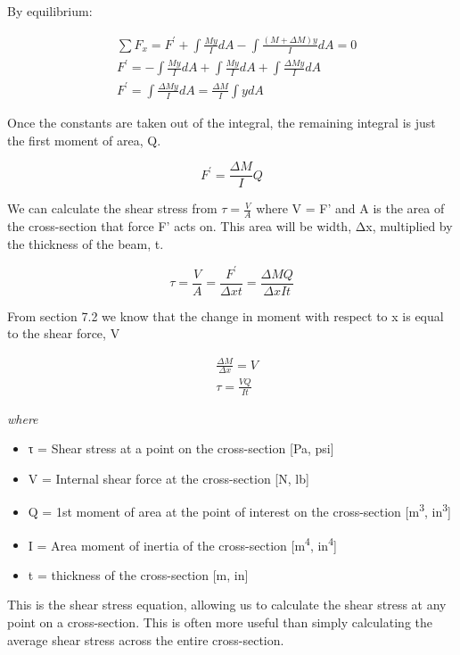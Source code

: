 \documentclass[
  letterpaper,
  DIV=11,
  numbers=noendperiod]{scrreprt}
\begin{document}
By equilibrium:

\[
\begin{aligned}
& \sum F_x=F^{\prime}+\int \frac{M y}{I} d A-\int \frac{(M+\Delta M) y}{I} d A=0 \\
& F^{\prime}=-\int \frac{M y}{I} d A+\int \frac{M y}{I} d A+\int \frac{\Delta M y}{I} d A \\
& F^{\prime}=\int \frac{\Delta M y}{I} d A=\frac{\Delta M}{I} \int y d A
\end{aligned}
\]

Once the constants are taken out of the integral, the remaining integral
is just the first moment of area, Q.

\[
F^{\prime}=\frac{\Delta M}{I} Q
\]

We can calculate the shear stress from \(\tau=\frac{V}{A}\) where V = F'
and A is the area of the cross-section that force F' acts on. This area
will be width, Δx, multiplied by the thickness of the beam, t.

\[
\tau=\frac{V}{A}=\frac{F^{\prime}}{\Delta x t}=\frac{\Delta M Q}{\Delta x I t}
\]

From section 7.2 we know that the change in moment with respect to x is
equal to the shear force, V

\[
\begin{aligned}
& \frac{\Delta M}{\Delta x}=V \\
& \tau=\frac{V Q}{I t}
\end{aligned}
\]

\emph{where}

\begin{itemize}
\item
  τ = Shear stress at a point on the cross-section {[}Pa, psi{]}
\item
  V = Internal shear force at the cross-section {[}N, lb{]}
\item
  Q = 1st moment of area at the point of interest on the cross-section
  {[}m\textsuperscript{3}, in\textsuperscript{3}{]}
\item
  I = Area moment of inertia of the cross-section
  {[}m\textsuperscript{4}, in\textsuperscript{4}{]}
\item
  t = thickness of the cross-section {[}m, in{]}
\end{itemize}

This is the shear stress equation, allowing us to calculate the shear
stress at any point on a cross-section. This is often more useful than
simply calculating the average shear stress across the entire
cross-section.
\end{document}
